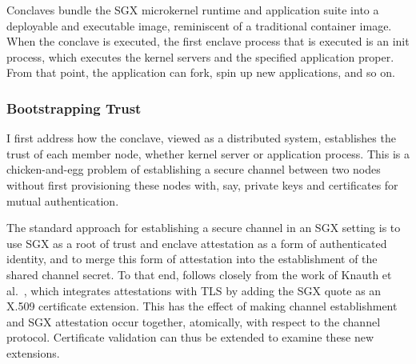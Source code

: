 Conclaves bundle the SGX microkernel runtime and application suite into a
deployable and executable image, reminiscent of a traditional container image.
%
When the conclave is executed, the first enclave process that is
executed is an init process, which executes the kernel servers and the
specified application proper.
%
From that point, the application can fork, spin up new applications,
and so on.


\subsubsection{Bootstrapping Trust} %


I first address how the conclave, viewed as a distributed system,
establishes the trust of each member node, whether kernel server or
application process.
%
This is a chicken-and-egg problem of establishing a secure channel
between two nodes without first provisioning these nodes with, say,
private keys and certificates for mutual authentication.
%



The standard approach for establishing a secure channel in an SGX setting is to use SGX
as a root of trust and enclave attestation as a form of authenticated identity,
and to merge this form of attestation into the establishment of the shared
channel secret.
%
To that end, \name follows closely from the work of Knauth et
al.~\cite{DBLP:journals/corr/abs-1801-05863}, which 
integrates attestations with TLS by adding the SGX quote as an X.509
certificate extension.
%
This has the effect of making channel establishment and SGX attestation
occur together,
atomically, with respect to the channel protocol.
%
Certificate validation can thus be extended to examine these new extensions.


